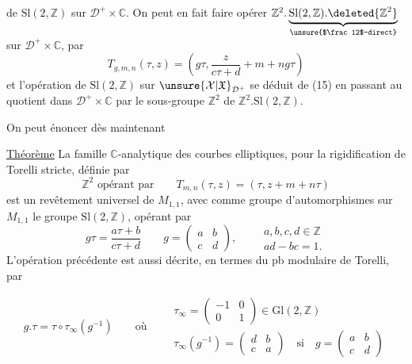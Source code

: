 de $\mathrm{Sl}(2,\mathbb Z)$ sur $\mathcal D^+\times\mathbb C$. On peut en fait
faire opérer $\mathbb Z^2.\underbrace{\mathrm{Sl}(2,\mathbb Z).\deleted{\mathbb Z^2}}_{\text{\unsure{$\frac12$-direct}}}$
sur $\mathcal D^+\times\mathbb C$,
par
\[
T_{g,m,n}(\tau,z)=\left(g\tau,\frac z{c\tau+d}+m+ng\tau\right)
\tag{15}
\]
et l'opération  de $\mathrm{Sl}(2,\mathbb Z)$ sur
$\unsure{\mathcal X|\mathfrak X}_{\mathcal D^+}$ se déduit de (15) en passant au
quotient  dans $\mathcal D^+\times\mathbb C$ par le sous-groupe
$\mathbb Z^2$ de $\mathbb Z^2.\mathrm{Sl}(2,\mathbb Z)$.

On peut énoncer dès maintenant

\uline{Théorème} La famille $\mathbb C$-analytique des courbes
elliptiques,   pour la rigidification de Torelli
stricte, définie par
\[
\mathbb Z^2\text{ opérant par}\qquad
T_{m,n}(\tau,z)=(\tau,z+m+n\tau)
\]
est un revêtement universel de $M_{1,1}$, avec
comme groupe d'automorphismes sur $M_{1,1}$
le groupe $\mathrm{Sl}(2,\mathbb Z)$, opérant par
\[
g\tau=\frac{a\tau+b}{c\tau+d}
\qquad
g=\begin{pmatrix}a&b\\c&d\end{pmatrix},
\qquad
\begin{gathered}
a,b,c,d\in\mathbb Z\\
ad-bc=1.
\end{gathered}
\]
L'opération précédente est aussi décrite, en
termes du pb modulaire de Torelli, par

\[
g.\tau=\tau\circ\tau_\infty(g^{-1})
\qquad\text{où}\qquad
\begin{gathered}
\tau_\infty=\begin{pmatrix}-1&0\\0&1\end{pmatrix}\in\mathrm{Gl}(2,\mathbb Z)\\
\tau_\infty(g^{-1})=\begin{pmatrix}d&b\\c&a\end{pmatrix}
\quad\text{si}\quad
g=\begin{pmatrix}a&b\\c&d\end{pmatrix}
\end{gathered}
\]


